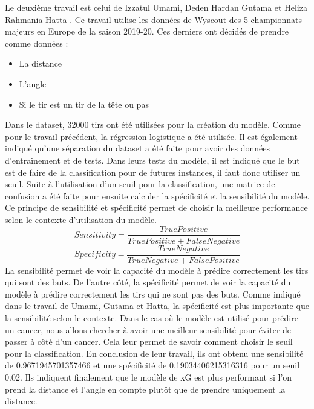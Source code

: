 \documentclass[12pt]{article}
\begin{document}
Le deuxième travail est celui de Izzatul Umami, Deden Hardan Gutama et Heliza Rahmania Hatta \cite{umamiImplementingExpectedGoal2021}. 
Ce travail utilise les données de Wyscout des 5 championnats majeurs en Europe de la saison 2019-20. Ces derniers ont décidés de prendre comme données :
\begin{itemize}
    \item La distance
    \item L'angle
    \item Si le tir est un tir de la tête ou pas
\end{itemize}
Dans le dataset, 32000 tirs ont été utilisées pour la création du modèle.
Comme pour le travail précédent, la régression logistique a été utilisée.
Il est également indiqué qu'une séparation du dataset a été faite pour avoir des données d'entraînement et de tests.
Dans leurs tests du modèle, il est indiqué que le but est de faire de la classification pour de futures instances, il faut donc utiliser un seuil.
Suite à l'utilisation d'un seuil pour la classification, une matrice de confusion a été faite pour ensuite calculer la spécificité et la sensibilité du modèle.
Ce principe de sensibilité et spécificité permet de choisir la meilleure performance selon le contexte d'utilisation du modèle.
\begin{equation}
    Sensitivity = \frac{True Positive}{True Positive + False Negative}
\end{equation}
\begin{equation}
    Specificity = \frac{True Negative}{True Negative + False Positive}
\end{equation}
La sensibilité permet de voir la capacité du modèle à prédire correctement les tirs qui sont des buts.
De l'autre côté, la spécificité permet de voir la capacité du modèle à prédire correctement les tirs qui ne sont pas des buts.
Comme indiqué dans le travail de Umami, Gutama et Hatta, la spécificité est plus importante que la sensibilité selon le contexte.
Dans le cas où le modèle est utilisé pour prédire un cancer, nous allons chercher à avoir une meilleur sensibilité pour éviter de passer à côté d'un cancer. \cite{umamiImplementingExpectedGoal2021}
Cela leur permet de savoir comment choisir le seuil pour la classification.
En conclusion de leur travail, ils ont obtenu une sensibilité de 0.9671945701357466 et une spécificité de 0.19034406215316316 pour un seuil 0.02.
Ils indiquent finalement que le modèle de xG est plus performant si l'on prend la distance et l'angle en compte plutôt que de prendre uniquement la distance.
\end{document}
